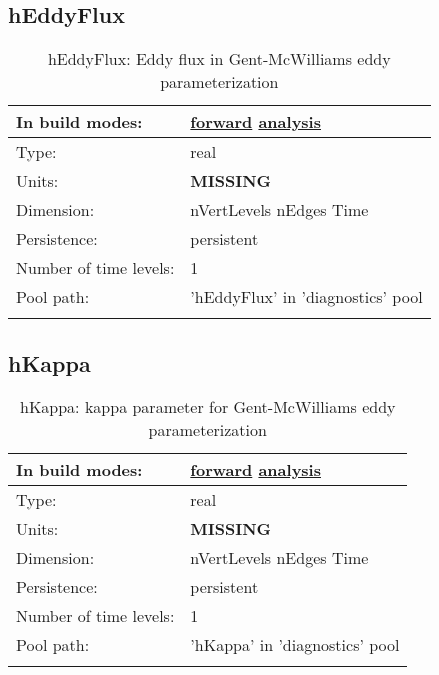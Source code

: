 \subsection[hEddyFlux]{hEddyFlux}
\label{subsec:var_sec_diagnostics_hEddyFlux}
\begin{center}
\begin{longtable}{| p{2.0in} | p{4.0in} |}
        \hline 
        In build modes: & \hyperref[subsec:forward_var_tab_diagnostics]{forward} \hyperref[subsec:analysis_var_tab_diagnostics]{analysis} \\
        \hline 
        Type: & real \\
        \hline 
        Units: & {\bf \color{red} MISSING} \\
        \hline 
        Dimension: & nVertLevels nEdges Time \\
        \hline 
        Persistence: & persistent \\
        \hline 
        Number of time levels: & 1 \\
        \hline 
            Pool path: & 'hEddyFlux' in 'diagnostics' pool
 \\
		 \hline 
    \caption{hEddyFlux: Eddy flux in Gent-McWilliams eddy parameterization}
\end{longtable}
\end{center}
\subsection[hKappa]{hKappa}
\label{subsec:var_sec_diagnostics_hKappa}
\begin{center}
\begin{longtable}{| p{2.0in} | p{4.0in} |}
        \hline 
        In build modes: & \hyperref[subsec:forward_var_tab_diagnostics]{forward} \hyperref[subsec:analysis_var_tab_diagnostics]{analysis} \\
        \hline 
        Type: & real \\
        \hline 
        Units: & {\bf \color{red} MISSING} \\
        \hline 
        Dimension: & nVertLevels nEdges Time \\
        \hline 
        Persistence: & persistent \\
        \hline 
        Number of time levels: & 1 \\
        \hline 
            Pool path: & 'hKappa' in 'diagnostics' pool
 \\
		 \hline 
    \caption{hKappa: kappa parameter for Gent-McWilliams eddy parameterization}
\end{longtable}
\end{center}

